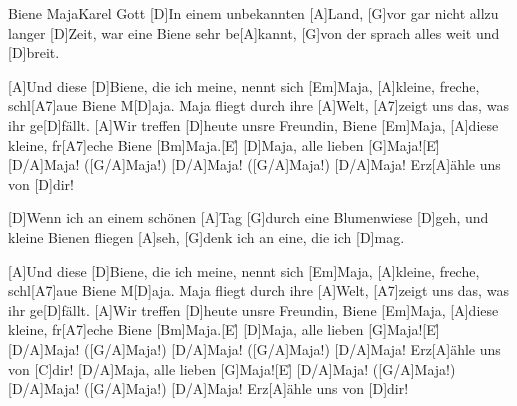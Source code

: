 \documentclass[../main.tex]{subfiles}
\begin{document}
\begin{song}[3]{Biene Maja}{Karel Gott}{}
[D]In einem unbekannten [A]Land, [G]vor gar nicht allzu langer [D]Zeit,
war eine Biene sehr be[A]kannt, [G]von der sprach alles weit und [D]breit.

[A]Und diese [D]Biene, die ich meine, nennt sich [Em]Maja,
[A]kleine, freche, schl[A7]aue Biene M[D]aja.
Maja fliegt durch ihre [A]Welt, [A7]zeigt uns das, was ihr ge[D]fällt.
[A]Wir treffen [D]heute unsre Freundin, Biene [Em]Maja,
[A]diese kleine, fr[A7]eche Biene [Bm]Maja.[E]{\h}
[D]Maja, alle lieben [G]Maja![E]{\h}
[D/A]Maja! ([G/A]Maja!) [D/A]Maja! ([G/A]Maja!) [D/A]Maja! Erz[A]{ä}hle uns von [D]dir!

[D]Wenn ich an einem schönen [A]Tag [G]durch eine Blumenwiese [D]geh,
und kleine Bienen fliegen [A]seh, [G]denk ich an eine, die ich [D]mag.

[A]Und diese [D]Biene, die ich meine, nennt sich [Em]Maja,
[A]kleine, freche, schl[A7]aue Biene M[D]aja.
Maja fliegt durch ihre [A]Welt, [A7]zeigt uns das, was ihr ge[D]fällt.
[A]Wir treffen [D]heute unsre Freundin, Biene [Em]Maja,
[A]diese kleine, fr[A7]eche Biene [Bm]Maja.[E]{\h}
[D]Maja, alle lieben [G]Maja![E]{\h}
[D/A]Maja! ([G/A]Maja!) [D/A]Maja! ([G/A]Maja!) [D/A]Maja! Erz[A]{ä}hle uns von [C]dir!
[D/A]Maja, alle lieben [G]Maja![E]{\h}
[D/A]Maja! ([G/A]Maja!) [D/A]Maja! ([G/A]Maja!) [D/A]Maja! Erz[A]{ä}hle uns von [D]dir!

\end{song}
\end{document}
